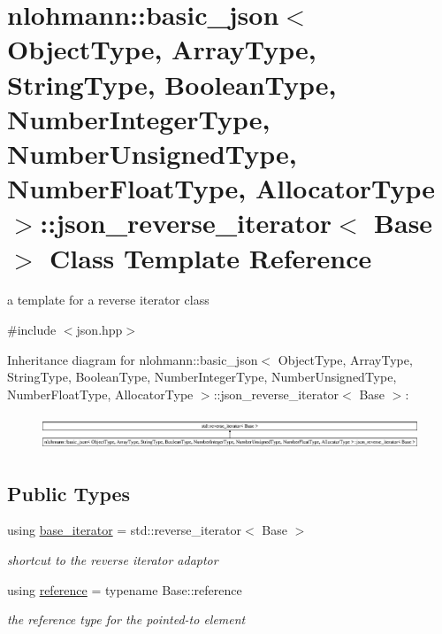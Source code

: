 \hypertarget{classnlohmann_1_1basic__json_1_1json__reverse__iterator}{}\section{nlohmann\+:\+:basic\+\_\+json$<$ Object\+Type, Array\+Type, String\+Type, Boolean\+Type, Number\+Integer\+Type, Number\+Unsigned\+Type, Number\+Float\+Type, Allocator\+Type $>$\+:\+:json\+\_\+reverse\+\_\+iterator$<$ Base $>$ Class Template Reference}
\label{classnlohmann_1_1basic__json_1_1json__reverse__iterator}


a template for a reverse iterator class  




{\ttfamily \#include $<$json.\+hpp$>$}

Inheritance diagram for nlohmann\+:\+:basic\+\_\+json$<$ Object\+Type, Array\+Type, String\+Type, Boolean\+Type, Number\+Integer\+Type, Number\+Unsigned\+Type, Number\+Float\+Type, Allocator\+Type $>$\+:\+:json\+\_\+reverse\+\_\+iterator$<$ Base $>$\+:\begin{figure}[H]
\begin{center}
\leavevmode
\includegraphics[height=1.036078cm]{classnlohmann_1_1basic__json_1_1json__reverse__iterator}
\end{center}
\end{figure}
\subsection*{Public Types}
\begin{DoxyCompactItemize}
\item 
using \hyperlink{classnlohmann_1_1basic__json_1_1json__reverse__iterator_a9ebc4c99e6fc90c965af0f39ad2ca70e}{base\+\_\+iterator} = std\+::reverse\+\_\+iterator$<$ Base $>$
\begin{DoxyCompactList}\small\item\em shortcut to the reverse iterator adaptor \end{DoxyCompactList}\item 
using \hyperlink{classnlohmann_1_1basic__json_1_1json__reverse__iterator_a7265535f39299824f9712a2ca15013c3}{reference} = typename Base\+::reference
\begin{DoxyCompactList}\small\item\em the reference type for the pointed-\/to element \end{DoxyCompactList}\end{DoxyCompactItemize}
